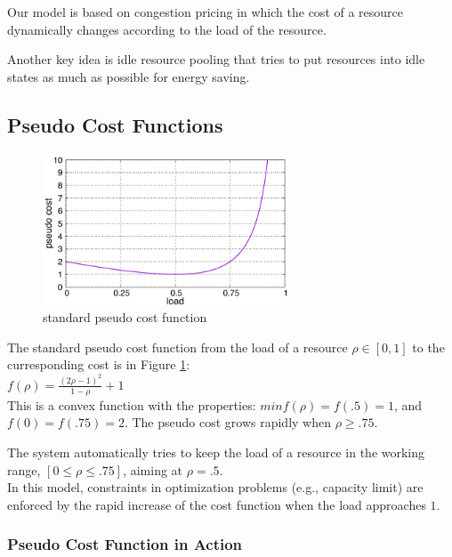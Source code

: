 
Our model is based on congestion pricing in which the cost of a
resource dynamically changes according to the load of the resource.

Another key idea is idle resource pooling that tries to put resources
into idle states as much as possible for energy saving.

\subsection{Pseudo Cost Functions}

\begin{figure}[thb]
\begin{center}
\includegraphics[width=7.5cm,clip]{costfunc.pdf}
\vspace{-2.0ex}
\caption{standard pseudo cost function}
\label{fig:std_costfunc}
\end{center}
\end{figure}

The standard pseudo cost function from the load of a resource
$\rho \in [0, 1]$ to the curresponding cost is in Figure
\ref{fig:std_costfunc}: \\

\( f(\rho) = \frac{(2\rho - 1)^{2}}{1 - \rho} + 1  \) \\

This is a convex function with the properties:
$min f(\rho) = f(.5) = 1$, and $f(0) = f(.75) = 2$.
The pseudo cost grows rapidly when $\rho \ge .75$.

The system automatically tries to keep the load of a resource in the
working range, $[0 \le \rho \le .75]$, aiming at $\rho = .5$. \\

In this model, constraints in optimization problems (e.g.,
capacity limit) are enforced by the rapid increase of the cost function when
the load approaches $1$. 

\subsubsection{Pseudo Cost Function in Action}

